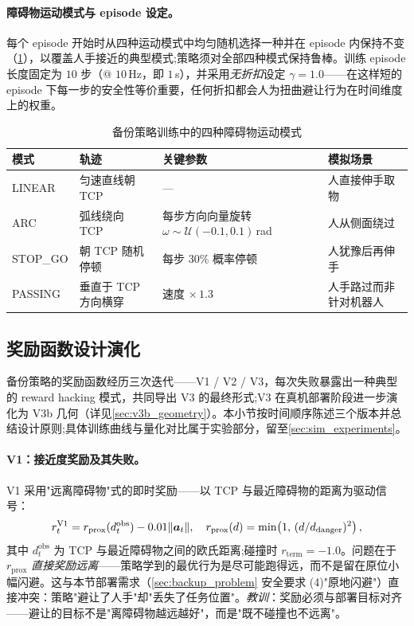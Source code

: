 \paragraph{障碍物运动模式与 episode 设定。}每个 episode 开始时从四种运动模式中均匀随机选择一种并在 episode 内保持不变（\cref{tab:motion_modes}），以覆盖人手接近的典型模式;策略须对全部四种模式保持鲁棒。训练 episode 长度固定为 $10$ 步（@ $10$\,Hz，即 $1$\,s），并采用\emph{无折扣}设定 $\gamma = 1.0$——在这样短的 episode 下每一步的安全性等价重要，任何折扣都会人为扭曲避让行为在时间维度上的权重。

\begin{table}[htbp]
  \centering
  \caption{备份策略训练中的四种障碍物运动模式}
  \label{tab:motion_modes}
  \footnotesize
  \begin{tabular}{@{}llll@{}}
    \toprule
    模式 & 轨迹 & 关键参数 & 模拟场景 \\
    \midrule
    LINEAR   & 匀速直线朝 TCP & --- & 人直接伸手取物 \\
    ARC      & 弧线绕向 TCP & 每步方向向量旋转 $\omega \sim \mathcal{U}(-0.1, 0.1)$\,rad & 人从侧面绕过 \\
    STOP\_GO & 朝 TCP 随机停顿 & 每步 $30\%$ 概率停顿 & 人犹豫后再伸手 \\
    PASSING  & 垂直于 TCP 方向横穿 & 速度 $\times\, 1.3$ & 人手路过而非针对机器人 \\
    \bottomrule
  \end{tabular}
\end{table}

\subsection{奖励函数设计演化}\label{sec:backup_reward}

备份策略的奖励函数经历三次迭代——V1 / V2 / V3，每次失败暴露出一种典型的 reward hacking 模式，共同导出 V3 的最终形式;V3 在真机部署阶段进一步演化为 V3b 几何（详见\cref{sec:v3b_geometry}）。本小节按时间顺序陈述三个版本并总结设计原则;具体训练曲线与量化对比属于实验部分，留至\cref{sec:sim_experiments}。

\paragraph{V1：接近度奖励及其失败。}V1 采用"远离障碍物"式的即时奖励——以 TCP 与最近障碍物的距离为驱动信号：
\begin{equation*}
  r_t^{\text{V1}} = r_{\text{prox}}(d_t^{\text{obs}}) - 0.01 \lVert \bm{a}_t \rVert,\quad
  r_{\text{prox}}(d) = \min\!\left(1, \, (d / d_{\text{danger}})^2\right),
\end{equation*}
其中 $d_t^{\text{obs}}$ 为 TCP 与最近障碍物之间的欧氏距离;碰撞时 $r_{\text{term}} = -1.0$。问题在于 $r_{\text{prox}}$ \emph{直接奖励远离}——策略学到的最优行为是尽可能跑得远，而不是留在原位小幅闪避。这与本节部署需求（\cref{sec:backup_problem} 安全要求 (4)"原地闪避"）直接冲突：策略"避让了人手"却"丢失了任务位置"。\emph{教训}：奖励必须与部署目标对齐——避让的目标不是"离障碍物越远越好"，而是"既不碰撞也不远离"。

